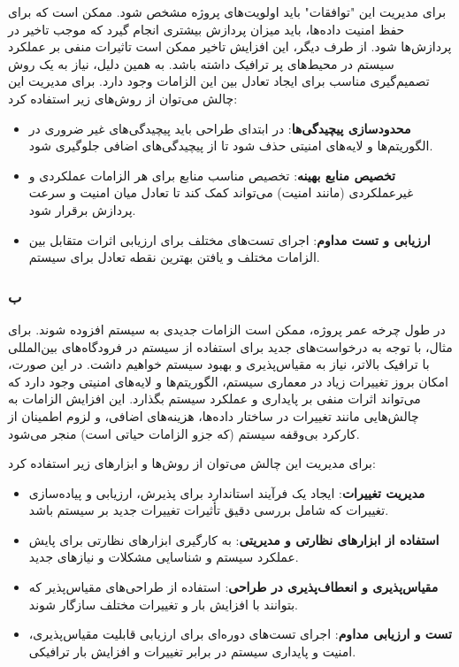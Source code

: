 برای مدیریت این "توافقات" باید اولویت‌های پروژه مشخص شود. ممکن است که برای حفظ امنیت داده‌ها، باید میزان پردازش بیشتری انجام گیرد که موجب تاخیر در پردازش‌ها شود. از طرف دیگر، این افزایش تاخیر ممکن است تاثیرات منفی بر عملکرد سیستم در محیط‌های پر ترافیک داشته باشد. به همین دلیل، نیاز به یک روش تصمیم‌گیری مناسب برای ایجاد تعادل بین این الزامات وجود دارد. برای مدیریت این چالش می‌توان از روش‌های زیر استفاده کرد:
\begin{itemize}
    \item \textbf{محدودسازی پیچیدگی‌ها}: در ابتدای طراحی باید پیچیدگی‌های غیر ضروری در الگوریتم‌ها و لایه‌های امنیتی حذف شود تا از پیچیدگی‌های اضافی جلوگیری شود.
    \item \textbf{تخصیص منابع بهینه}: تخصیص مناسب منابع برای هر الزامات عملکردی و غیرعملکردی (مانند امنیت) می‌تواند کمک کند تا تعادل میان امنیت و سرعت پردازش برقرار شود.
    \item \textbf{ارزیابی و تست مداوم}: اجرای تست‌های مختلف برای ارزیابی اثرات متقابل بین الزامات مختلف و یافتن بهترین نقطه تعادل برای سیستم.
\end{itemize}



\subsubsection*{ب}

در طول چرخه عمر پروژه، ممکن است الزامات جدیدی به سیستم افزوده شوند. برای مثال، با توجه به درخواست‌های جدید برای استفاده از سیستم در فرودگاه‌های بین‌المللی با ترافیک بالاتر، نیاز به مقیاس‌پذیری و بهبود سیستم خواهیم داشت. در این صورت، امکان بروز تغییرات زیاد در معماری سیستم، الگوریتم‌ها و لایه‌های امنیتی وجود دارد که می‌تواند اثرات منفی بر پایداری و عملکرد سیستم بگذارد. این افزایش الزامات به چالش‌هایی مانند تغییرات در ساختار داده‌ها، هزینه‌های اضافی، و لزوم اطمینان از کارکرد بی‌وقفه سیستم (که جزو الزامات حیاتی است) منجر می‌شود.

برای مدیریت این چالش می‌توان از روش‌ها و ابزارهای زیر استفاده کرد:
\begin{itemize}
    \item \textbf{مدیریت تغییرات}: ایجاد یک فرآیند استاندارد برای پذیرش، ارزیابی و پیاده‌سازی تغییرات که شامل بررسی دقیق تأثیرات تغییرات جدید بر سیستم باشد.
    \item \textbf{استفاده از ابزارهای نظارتی و مدیریتی}: به کارگیری ابزارهای نظارتی برای پایش عملکرد سیستم و شناسایی مشکلات و نیازهای جدید.
    \item \textbf{مقیاس‌پذیری و انعطاف‌پذیری در طراحی}: استفاده از طراحی‌های مقیاس‌پذیر که بتوانند با افزایش بار و تغییرات مختلف سازگار شوند.
    \item \textbf{تست و ارزیابی مداوم}: اجرای تست‌های دوره‌ای برای ارزیابی قابلیت مقیاس‌پذیری، امنیت و پایداری سیستم در برابر تغییرات و افزایش بار ترافیکی.
\end{itemize}